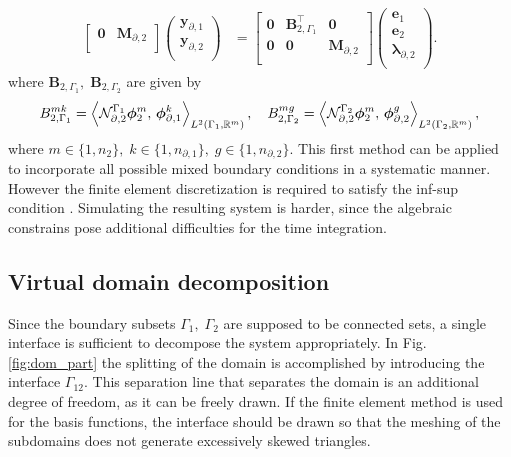 \begin{equation}
\begin{aligned}
\begin{bmatrix}
\mathbf{0} & \mathbf{M}_{\partial, 2} \\
\end{bmatrix}
\begin{pmatrix}
\mathbf{y}_{\partial, 1} \\
\mathbf{y}_{\partial, 2} \\
\end{pmatrix}
&= \begin{bmatrix}
\mathbf{0} & \mathbf{B}_{2, \Gamma_1}^\top & \mathbf{0} \\
\mathbf{0} & \mathbf{0} & \mathbf{M}_{\partial, 2} \\
\end{bmatrix}\begin{pmatrix}
\mathbf{e}_{1} \\
\mathbf{e}_{2} \\
{\bm{\lambda}}_{\partial, 2} \\
\end{pmatrix}.
\end{aligned}
\end{equation}
where $\mathbf{B}_{2, \Gamma_1}, \; \mathbf{B}_{2, \Gamma_2}$ are given by
\begin{equation}
{B}_{2, \Gamma_1}^{mk} = \inner[L^2(\Gamma_1, \mathbb{R}^m)]{\mathcal{N}_{\partial, 2}^{\Gamma_1}\bm{\phi}_{2}^m}{\bm{\phi}_{\partial, 1}^k}, \quad
{B}_{2, \Gamma_2}^{mg} = \inner[L^2(\Gamma_2, \mathbb{R}^m)]{\mathcal{N}_{\partial, 2}^{\Gamma_2}\bm{\phi}_{2}^m}{\bm{\phi}_{\partial, 2}^g}, 
\end{equation} 
where $m \in \{1,n_2\},\; k \in \{1,n_{\partial, 1}\},\; g \in \{1,n_{\partial, 2}\}$. This first method can be applied to incorporate all possible mixed boundary conditions in a systematic manner. However the finite element discretization is required to satisfy the inf-sup condition \cite{stenberg1995some}. Simulating the resulting system is harder, since the algebraic constrains pose additional difficulties for the time integration.

\subsection{Virtual domain decomposition}\label{sec:vdd}
Since the boundary subsets $\Gamma_1, \; \Gamma_2$ are supposed to be connected sets, a single interface is sufficient to decompose the system appropriately. In Fig. \ref{fig:dom_part} the splitting of the domain is accomplished by introducing the interface $\Gamma_{12}$. This separation line that separates the domain is an additional degree of freedom, as it can be freely drawn. If the finite element method is used for the basis functions, the interface should be drawn so that the meshing of the subdomains does not generate excessively skewed triangles. 


